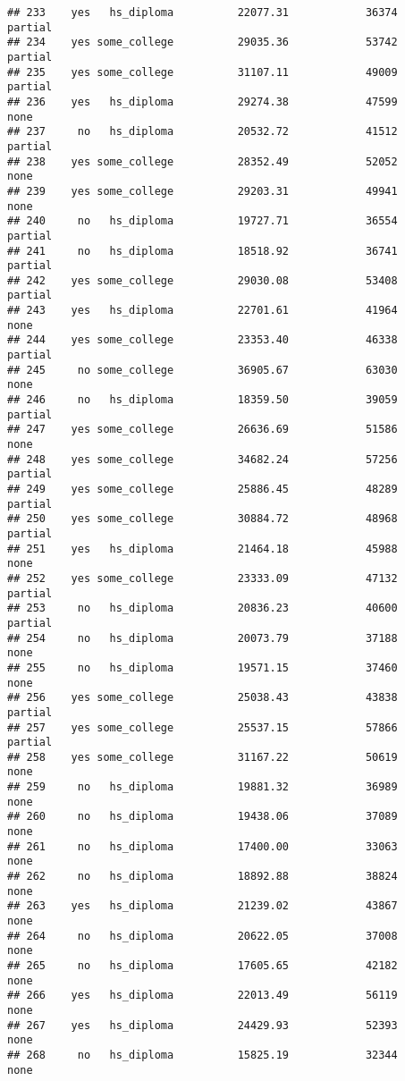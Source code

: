\documentclass[
]{article}
\begin{document}
\begin{verbatim}
## 233    yes   hs_diploma          22077.31            36374     partial
## 234    yes some_college          29035.36            53742     partial
## 235    yes some_college          31107.11            49009     partial
## 236    yes   hs_diploma          29274.38            47599        none
## 237     no   hs_diploma          20532.72            41512     partial
## 238    yes some_college          28352.49            52052        none
## 239    yes some_college          29203.31            49941        none
## 240     no   hs_diploma          19727.71            36554     partial
## 241     no   hs_diploma          18518.92            36741     partial
## 242    yes some_college          29030.08            53408     partial
## 243    yes   hs_diploma          22701.61            41964        none
## 244    yes some_college          23353.40            46338     partial
## 245     no some_college          36905.67            63030        none
## 246     no   hs_diploma          18359.50            39059     partial
## 247    yes some_college          26636.69            51586        none
## 248    yes some_college          34682.24            57256     partial
## 249    yes some_college          25886.45            48289     partial
## 250    yes some_college          30884.72            48968     partial
## 251    yes   hs_diploma          21464.18            45988        none
## 252    yes some_college          23333.09            47132     partial
## 253     no   hs_diploma          20836.23            40600     partial
## 254     no   hs_diploma          20073.79            37188        none
## 255     no   hs_diploma          19571.15            37460        none
## 256    yes some_college          25038.43            43838     partial
## 257    yes some_college          25537.15            57866     partial
## 258    yes some_college          31167.22            50619        none
## 259     no   hs_diploma          19881.32            36989        none
## 260     no   hs_diploma          19438.06            37089        none
## 261     no   hs_diploma          17400.00            33063        none
## 262     no   hs_diploma          18892.88            38824        none
## 263    yes   hs_diploma          21239.02            43867        none
## 264     no   hs_diploma          20622.05            37008        none
## 265     no   hs_diploma          17605.65            42182        none
## 266    yes   hs_diploma          22013.49            56119        none
## 267    yes   hs_diploma          24429.93            52393        none
## 268     no   hs_diploma          15825.19            32344        none

\end{verbatim}
\end{document}
